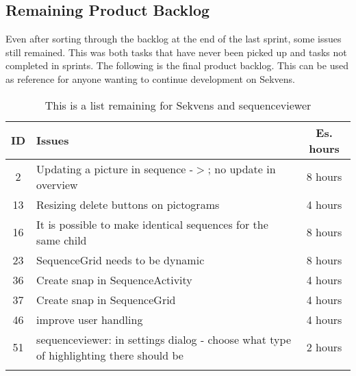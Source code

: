 \subsection{Remaining Product Backlog}
Even after sorting through the backlog at the end of the last sprint, some issues still remained. This was both tasks that have never been picked up and tasks not completed in sprints. The following is the final product backlog. This can be used as reference for anyone wanting to continue development on Sekvens.

\begin{longtable} { | c | p{12cm} | c | } 
\hline
	ID 	&	Issues	&	 Es. hours \\\hline
	2	& 	Updating a picture in sequence -$>$; no update in overview	& 	8 hours  \\\hline
	13	& 	Resizing delete buttons on pictograms	& 	4 hours  \\\hline
	16	& 	It is possible to make identical sequences for the same child	& 	8 hours  \\\hline
	23	& 	SequenceGrid needs to be dynamic	& 	8 hours  \\\hline
	36	& 	Create snap in SequenceActivity	& 	4 hours  \\\hline
	37	& 	Create snap in SequenceGrid	& 	4 hours  \\\hline
	46	& 	improve user handling 	& 	4 hours  \\\hline
	51	& 	sequenceviewer: in settings dialog - choose what type of highlighting there should be	& 	2 hours  \\\hline
\caption{This is a list remaining for Sekvens and sequenceviewer}
\label{tab:spr4_sw_prodblog}
\end{longtable}


